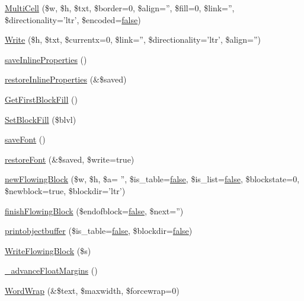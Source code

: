 \begin{DoxyCompactItemize}
\hyperlink{classm_p_d_f_a6894a8333d87a4eec1e08a63c73e00bc}{Multi\-Cell} (\$w, \$h, \$txt, \$border=0, \$align='', \$fill=0, \$link='', \$directionality='ltr', \$encoded=\hyperlink{ttfontsuni_8php_afbaa04e5cc97693dc668b3c45d3dd740}{false})
\item 
\hyperlink{classm_p_d_f_af8ff1b97b79cbca7baf2b655e120bf22}{Write} (\$h, \$txt, \$currentx=0, \$link='', \$directionality='ltr', \$align='')
\item 
\hyperlink{classm_p_d_f_ac278c07c27efdaf6e793cd4a7c0fdebe}{save\-Inline\-Properties} ()
\item 
\hyperlink{classm_p_d_f_a7670a851f4514301724fa28361154a0d}{restore\-Inline\-Properties} (\&\$saved)
\item 
\hyperlink{classm_p_d_f_a3047beed23604aac8cbb8c6407c891f3}{Get\-First\-Block\-Fill} ()
\item 
\hyperlink{classm_p_d_f_a4040d0bc5194476b4c0bfe13500132f1}{Set\-Block\-Fill} (\$blvl)
\item 
\hyperlink{classm_p_d_f_ae3338796ac56b8508d308bb4cd846aee}{save\-Font} ()
\item 
\hyperlink{classm_p_d_f_a814ede78083fa0d2d4a51012ea37de43}{restore\-Font} (\&\$saved, \$write=true)
\item 
\hyperlink{classm_p_d_f_a405b87556e8b30735ab4f1f0d872fd03}{new\-Flowing\-Block} (\$w, \$h, \$a= '', \$is\-\_\-table=\hyperlink{ttfontsuni_8php_afbaa04e5cc97693dc668b3c45d3dd740}{false}, \$is\-\_\-list=\hyperlink{ttfontsuni_8php_afbaa04e5cc97693dc668b3c45d3dd740}{false}, \$blockstate=0, \$newblock=true, \$blockdir='ltr')
\item 
\hyperlink{classm_p_d_f_ac1b3a6338308eb736b7d8185ecfee4d7}{finish\-Flowing\-Block} (\$endofblock=\hyperlink{ttfontsuni_8php_afbaa04e5cc97693dc668b3c45d3dd740}{false}, \$next='')
\item 
\hyperlink{classm_p_d_f_a1a8c3da7ea5e2df03460a06f62abccf4}{printobjectbuffer} (\$is\-\_\-table=\hyperlink{ttfontsuni_8php_afbaa04e5cc97693dc668b3c45d3dd740}{false}, \$blockdir=\hyperlink{ttfontsuni_8php_afbaa04e5cc97693dc668b3c45d3dd740}{false})
\item 
\hyperlink{classm_p_d_f_a1030e16afc45d49cc7d0927e4837abc1}{Write\-Flowing\-Block} (\$s)
\item 
\hyperlink{classm_p_d_f_ae2693948f683b37b6ec36665433b5b75}{\-\_\-advance\-Float\-Margins} ()
\item 
\hyperlink{classm_p_d_f_a3c74f4f31cab8603a5c0bf3dbc4d314f}{Word\-Wrap} (\&\$text, \$maxwidth, \$forcewrap=0)
\item 

\end{DoxyCompactItemize}
